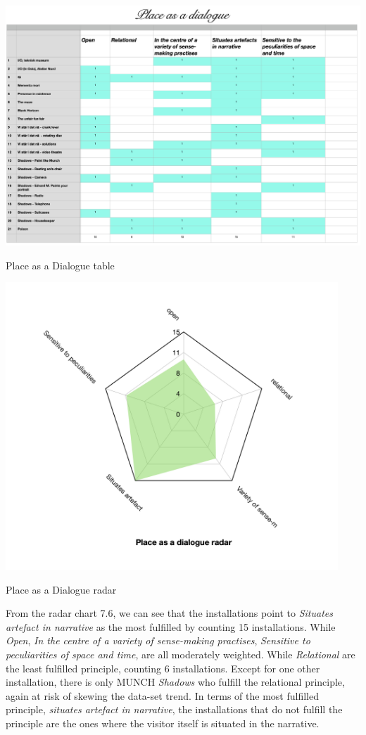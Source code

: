 \begin{table}[H]
    \centering 
    \includegraphics[width=20cm, angle=90]{pictures/analysis/place.png}
    \caption{Place as a Dialogue table}
\end{table}

\begin{table}[H]
    \centering 
    \includegraphics[width=12.5cm]{pictures/analysis/place_radar.png}
    \caption{Place as a Dialogue radar}
\end{table}


From the radar chart 7.6, we can see that the installations point to \textit{Situates artefact in narrative} as the most fulfilled by counting 15 installations. While \textit{Open}, \textit{In the centre of a variety of sense-making practises}, \textit{Sensitive to peculiarities of space and time}, are all moderately weighted. While \textit{Relational} are the least fulfilled principle, counting 6 installations. Except for one other installation, there is only MUNCH \emph{Shadows} who fulfill the relational principle, again at risk of skewing the data-set trend. In terms of the most fulfilled principle, \emph{situates artefact in narrative}, the installations that do not fulfill the principle are the ones where the visitor itself is situated in the narrative.


